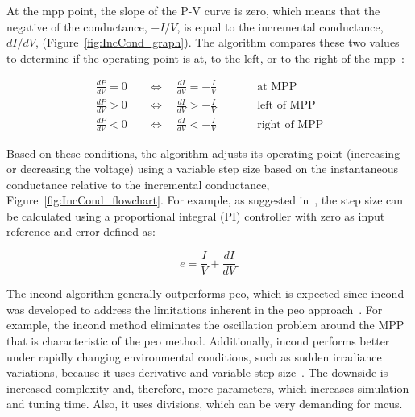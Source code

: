         At the \ac{mpp} point, the slope of the P-V curve is zero, which means that the negative of the conductance, $-I / V$, is equal to the incremental conductance, $dI / dV$, (Figure~\ref{fig:IncCond_graph}). The algorithm compares these two values to determine if the operating point is at, to the left, or to the right of the \ac{mpp}~\cite{MPPT_Comparison_techniques}\cite{Comparison_PV_Array_MPPT_Techniques_2007}:

        \begin{equation}
            \begin{aligned}
            \frac{dP}{dV}=0 \quad&\Longleftrightarrow\quad \frac{dI}{dV}=-\frac{I}{V}
            \qquad &&\text{at MPP} \\[4pt]
            \frac{dP}{dV}>0 \quad&\Longleftrightarrow\quad \frac{dI}{dV}>-\frac{I}{V}
            \qquad &&\text{left of MPP} \\[4pt]
            \frac{dP}{dV}<0 \quad&\Longleftrightarrow\quad \frac{dI}{dV}<-\frac{I}{V}
            \qquad &&\text{right of MPP}
            \end{aligned}
            \label{eq:inc_cond}
        \end{equation}


        Based on these conditions, the algorithm adjusts its operating point (increasing or decreasing the voltage) using a variable step size based on the instantaneous conductance relative to the incremental conductance, Figure~\ref{fig:IncCond_flowchart}. For example, as suggested in~\cite{Comparison_PV_Array_MPPT_Techniques_2007}, the step size can be calculated using a proportional integral (PI) controller with zero as input reference and error defined as:

        \begin{equation}
            e = \frac{I}{V} + \frac{dI}{dV} .
        \end{equation}

        The \ac{incond} algorithm generally outperforms \acs{peo}, which is expected since \ac{incond} was developed to address the limitations inherent in the \acs{peo} approach~\cite{Intelligent_PV_Module_2006}. For example, the \ac{incond} method eliminates the oscillation problem around the MPP that is characteristic of the \acs{peo} method. Additionally, \ac{incond} performs better under rapidly changing environmental conditions, such as sudden irradiance variations, because it uses derivative and variable step size~\cite{bendib_survey_mppt_methods}. The downside is increased complexity and, therefore, more parameters, which increases simulation and tuning time. Also, it uses divisions, which can be very demanding for \acp{mcu}.

